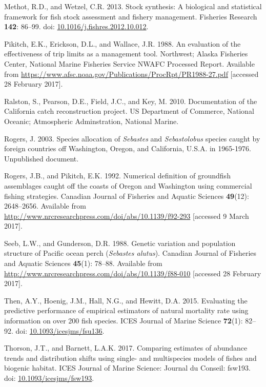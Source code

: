 \documentclass[12pt,]{article}
\begin{document}
\hypertarget{ref-methot_stock_2013}{}
Methot, R.D., and Wetzel, C.R. 2013. Stock synthesis: A biological and
statistical framework for fish stock assessment and fishery management.
Fisheries Research \textbf{142}: 86--99. doi:
\href{https://doi.org/10.1016/j.fishres.2012.10.012}{10.1016/j.fishres.2012.10.012}.

\hypertarget{ref-pikitch_evaluation_1988}{}
Pikitch, E.K., Erickson, D.L., and Wallace, J.R. 1988. An evaluation of
the effectiveness of trip limits as a management tool. Northwest; Alaska
Fisheries Center, National Marine Fisheries Service NWAFC Processed
Report. Available from
\url{https://www.afsc.noaa.gov/Publications/ProcRpt/PR1988-27.pdf}
{[}accessed 28 February 2017{]}.

\hypertarget{ref-ralston_documentation_2010}{}
Ralston, S., Pearson, D.E., Field, J.C., and Key, M. 2010. Documentation
of the California catch reconstruction project. US Department of
Commerce, National Oceanic; Atmospheric Adminstration, National Marine.

\hypertarget{ref-rogers_species_2003}{}
Rogers, J. 2003. Species allocation of \emph{Sebastes} and
\emph{Sebastolobus} species caught by foreign countries off Washington,
Oregon, and California, U.S.A. in 1965-1976. Unpublished document.

\hypertarget{ref-rogers_numerical_1992}{}
Rogers, J.B., and Pikitch, E.K. 1992. Numerical definition of groundfish
assemblages caught off the coasts of Oregon and Washington using
commercial fishing strategies. Canadian Journal of Fisheries and Aquatic
Sciences \textbf{49}(12): 2648--2656. Available from
\url{http://www.nrcresearchpress.com/doi/abs/10.1139/f92-293}
{[}accessed 9 March 2017{]}.

\hypertarget{ref-seeb_genetic_1988}{}
Seeb, L.W., and Gunderson, D.R. 1988. Genetic variation and population
structure of Pacific ocean perch (\emph{Sebastes alutus}). Canadian
Journal of Fisheries and Aquatic Sciences \textbf{45}(1): 78--88.
Available from
\url{http://www.nrcresearchpress.com/doi/abs/10.1139/f88-010}
{[}accessed 28 February 2017{]}.

\hypertarget{ref-then_evaluating_2015}{}
Then, A.Y., Hoenig, J.M., Hall, N.G., and Hewitt, D.A. 2015. Evaluating
the predictive performance of empirical estimators of natural mortality
rate using information on over 200 fish species. ICES Journal of Marine
Science \textbf{72}(1): 82--92. doi:
\href{https://doi.org/10.1093/icesjms/fsu136}{10.1093/icesjms/fsu136}.

\hypertarget{ref-thorson_comparing_2017}{}
Thorson, J.T., and Barnett, L.A.K. 2017. Comparing estimates of
abundance trends and distribution shifts using single- and multispecies
models of fishes and biogenic habitat. ICES Journal of Marine Science:
Journal du Conseil: fsw193. doi:
\href{https://doi.org/10.1093/icesjms/fsw193}{10.1093/icesjms/fsw193}.
\end{document}
